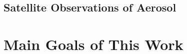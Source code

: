 \subsection{Satellite Observations of Aerosol}

\begin{table}[h]
  \centering
  \small
  \caption{List of satellite sensors with measurement specifications 
  relevant for operation retrieval of aerosol properties.}
  \label{tab:satellites}
\end{table}

\section{Main Goals of This Work}

